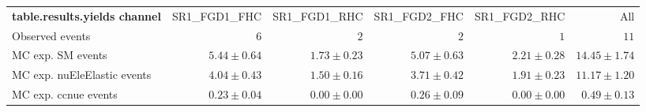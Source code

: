 

\begin{table}
\begin{center}
\setlength{\tabcolsep}{0.0pc}
{\small
\begin{tabular*}{\textwidth}{@{\extracolsep{\fill}}lrrrrr}
\noalign{\smallskip}\hline\noalign{\smallskip}
{\bf table.results.yields channel}           & SR1\_FGD1\_FHC            & SR1\_FGD1\_RHC            & SR1\_FGD2\_FHC            & SR1\_FGD2\_RHC            & All              \\[-0.05cm]
\noalign{\smallskip}\hline\noalign{\smallskip}
Observed events          & $6$              & $2$              & $2$              & $1$              & $11$                    \\
\noalign{\smallskip}\hline\noalign{\smallskip}
MC exp. SM events              & $5.44 \pm 0.64$          & $1.73 \pm 0.23$          & $5.07 \pm 0.63$          & $2.21 \pm 0.28$          & $14.45 \pm 1.74$              \\
\noalign{\smallskip}\hline\noalign{\smallskip}
        MC exp. nuEleElastic events         & $4.04 \pm 0.43$          & $1.50 \pm 0.16$          & $3.71 \pm 0.42$          & $1.91 \pm 0.23$          & $11.17 \pm 1.20$              \\
        MC exp. ccnue events         & $0.23 \pm 0.04$          & $0.00 \pm 0.00$          & $0.26 \pm 0.09$          & $0.00 \pm 0.00$          & $0.49 \pm 0.13$              \\

\end{tabular*}}
\end{center}
\end{table}
